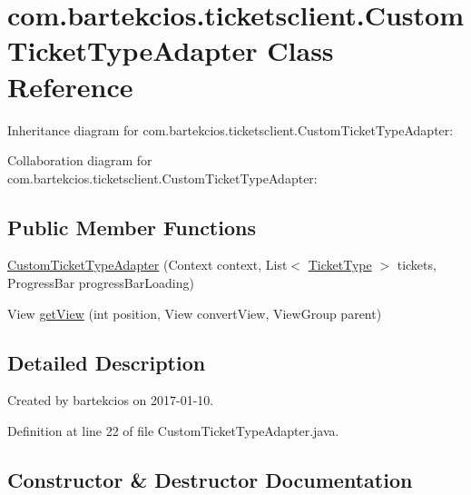 \hypertarget{classcom_1_1bartekcios_1_1ticketsclient_1_1_custom_ticket_type_adapter}{}\section{com.\+bartekcios.\+ticketsclient.\+Custom\+Ticket\+Type\+Adapter Class Reference}
\label{classcom_1_1bartekcios_1_1ticketsclient_1_1_custom_ticket_type_adapter}


Inheritance diagram for com.\+bartekcios.\+ticketsclient.\+Custom\+Ticket\+Type\+Adapter\+:


Collaboration diagram for com.\+bartekcios.\+ticketsclient.\+Custom\+Ticket\+Type\+Adapter\+:
\subsection*{Public Member Functions}
\begin{DoxyCompactItemize}
\item 
\hyperlink{classcom_1_1bartekcios_1_1ticketsclient_1_1_custom_ticket_type_adapter_ae7f3c3cd6a3135e7dc85fa2445fbb3b3}{Custom\+Ticket\+Type\+Adapter} (Context context, List$<$ \hyperlink{classcom_1_1bartekcios_1_1ticketsclient_1_1_ticket_type}{Ticket\+Type} $>$ tickets, Progress\+Bar progress\+Bar\+Loading)
\item 
View \hyperlink{classcom_1_1bartekcios_1_1ticketsclient_1_1_custom_ticket_type_adapter_acf4fd29b15524f88e0a297603bbdc6f0}{get\+View} (int position, View convert\+View, View\+Group parent)
\end{DoxyCompactItemize}


\subsection{Detailed Description}
Created by bartekcios on 2017-\/01-\/10. 

Definition at line 22 of file Custom\+Ticket\+Type\+Adapter.\+java.



\subsection{Constructor \& Destructor Documentation}
\mbox{\label{classcom_1_1bartekcios_1_1ticketsclient_1_1_custom_ticket_type_adapter_ae7f3c3cd6a3135e7dc85fa2445fbb3b3}} 
